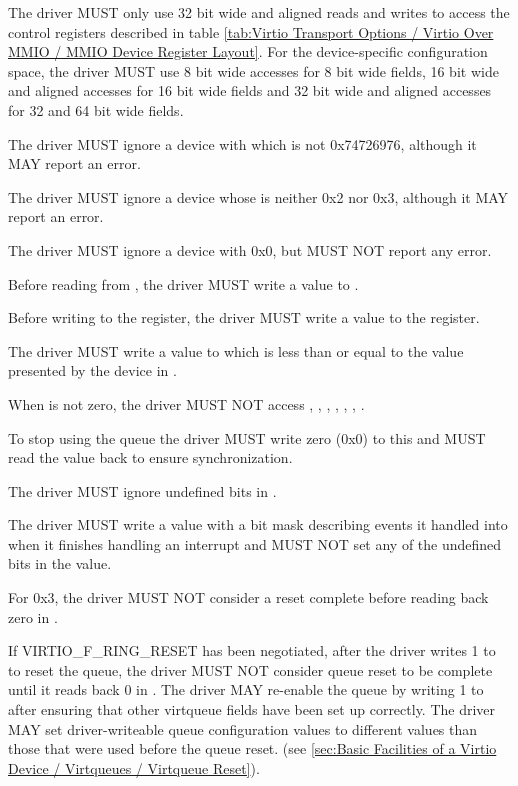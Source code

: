 The driver MUST only use 32 bit wide and aligned reads and writes to access the control registers
described in table \ref{tab:Virtio Transport Options / Virtio Over MMIO / MMIO Device Register Layout}.
For the device-specific configuration space, the driver MUST use 8 bit wide accesses for
8 bit wide fields, 16 bit wide and aligned accesses for 16 bit wide fields and 32 bit wide and
aligned accesses for 32 and 64 bit wide fields.

The driver MUST ignore a device with  which is not 0x74726976,
although it MAY report an error.

The driver MUST ignore a device whose  is neither 0x2 nor 0x3,
although it MAY report an error.

The driver MUST ignore a device with  0x0,
but MUST NOT report any error.

Before reading from , the driver MUST write a value to .

Before writing to the  register, the driver MUST write a value to the  register.

The driver MUST write a value to  which is less than
or equal to the value presented by the device in .

When  is not zero, the driver MUST NOT access
, , ,
, , , .

To stop using the queue the driver MUST write zero (0x0) to this
 and MUST read the value back to ensure
synchronization.

The driver MUST ignore undefined bits in .

The driver MUST write a value with a bit mask describing events it handled into  when
it finishes handling an interrupt and MUST NOT set any of the undefined bits in the value.

For  0x3, the driver MUST NOT consider a reset complete before
reading back zero in .

If VIRTIO_F_RING_RESET has been negotiated, after the driver writes 1 to
 to reset the queue, the driver MUST NOT consider queue
reset to be complete until it reads back 0 in . The driver
MAY re-enable the queue by writing 1 to  after ensuring
that other virtqueue fields have been set up correctly. The driver MAY set
driver-writeable queue configuration values to different values than those
that were used before the queue reset.
(see \ref{sec:Basic Facilities of a Virtio Device / Virtqueues / Virtqueue Reset}).

